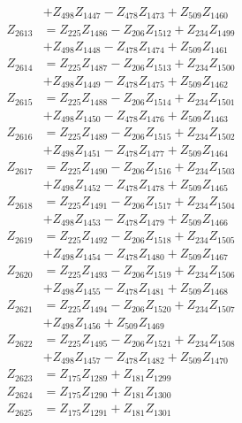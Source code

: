 \begin{multicols}{2}
\begin{align}
&+ Z_{498}Z_{1447} - Z_{478}Z_{1473} + Z_{509}Z_{1460} \nonumber \\
Z_{2613} &= Z_{225}Z_{1486} - Z_{206}Z_{1512} + Z_{234}Z_{1499}  \nonumber \\
&+ Z_{498}Z_{1448} - Z_{478}Z_{1474} + Z_{509}Z_{1461} \nonumber \\
Z_{2614} &= Z_{225}Z_{1487} - Z_{206}Z_{1513} + Z_{234}Z_{1500}  \nonumber \\
&+ Z_{498}Z_{1449} - Z_{478}Z_{1475} + Z_{509}Z_{1462} \nonumber \\
Z_{2615} &= Z_{225}Z_{1488} - Z_{206}Z_{1514} + Z_{234}Z_{1501}  \nonumber \\
&+ Z_{498}Z_{1450} - Z_{478}Z_{1476} + Z_{509}Z_{1463} \nonumber \\
Z_{2616} &= Z_{225}Z_{1489} - Z_{206}Z_{1515} + Z_{234}Z_{1502}  \nonumber \\
&+ Z_{498}Z_{1451} - Z_{478}Z_{1477} + Z_{509}Z_{1464} \nonumber \\
Z_{2617} &= Z_{225}Z_{1490} - Z_{206}Z_{1516} + Z_{234}Z_{1503}  \nonumber \\
&+ Z_{498}Z_{1452} - Z_{478}Z_{1478} + Z_{509}Z_{1465} \nonumber \\
Z_{2618} &= Z_{225}Z_{1491} - Z_{206}Z_{1517} + Z_{234}Z_{1504}  \nonumber \\
&+ Z_{498}Z_{1453} - Z_{478}Z_{1479} + Z_{509}Z_{1466} \nonumber \\
Z_{2619} &= Z_{225}Z_{1492} - Z_{206}Z_{1518} + Z_{234}Z_{1505}  \nonumber \\
&+ Z_{498}Z_{1454} - Z_{478}Z_{1480} + Z_{509}Z_{1467} \nonumber \\
Z_{2620} &= Z_{225}Z_{1493} - Z_{206}Z_{1519} + Z_{234}Z_{1506}  \nonumber \\
&+ Z_{498}Z_{1455} - Z_{478}Z_{1481} + Z_{509}Z_{1468} \nonumber \\
Z_{2621} &= Z_{225}Z_{1494} - Z_{206}Z_{1520} + Z_{234}Z_{1507}  \nonumber \\
&+ Z_{498}Z_{1456} + Z_{509}Z_{1469} \nonumber \\
Z_{2622} &= Z_{225}Z_{1495} - Z_{206}Z_{1521} + Z_{234}Z_{1508}  \nonumber \\
&+ Z_{498}Z_{1457} - Z_{478}Z_{1482} + Z_{509}Z_{1470} \nonumber \\
Z_{2623} &= Z_{175}Z_{1289} + Z_{181}Z_{1299} \nonumber \\
Z_{2624} &= Z_{175}Z_{1290} + Z_{181}Z_{1300} \nonumber \\
Z_{2625} &= Z_{175}Z_{1291} + Z_{181}Z_{1301} \nonumber \\

\end{align}
\end{multicols}
